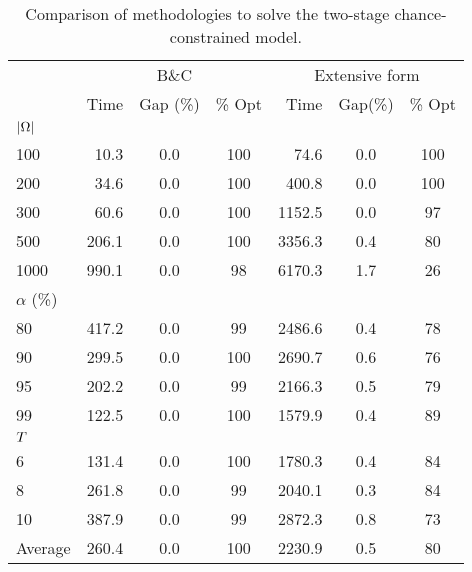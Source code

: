 \documentclass[msom]{oo}
\begin{document}
\begin{table}[ht]
\small
\centering
\caption{Comparison of methodologies to solve the two-stage chance-constrained model.}
\label{tab:MethodologyCompare}
\renewcommand{\arraystretch}{0.8}
\begin{tabular}{lrccrcc}
\toprule
  & \multicolumn{3}{c}{ B\&C} &  \multicolumn{3}{c}{Extensive form}
  \\
\cmidrule(lr){2-4}
\cmidrule(lr){5-7}
& Time       & Gap (\%)       & \% Opt      & Time    & Gap(\%)     & \% Opt   \\
\midrule
$|\Omega|$  &&&&&&\\
100	&	10.3	&	0.0	&	100	&	74.6	&	0.0	&	100	\\
200	&	34.6	&	0.0	&	100	&	400.8	&	0.0	&	100	\\
300	&	60.6	&	0.0	&	100	&		1152.5	&	0.0	&	97	\\
500	&	206.1	&	0.0	&	100	&	3356.3	&	0.4	&	80	\\
1000	&	990.1	&	0.0	&	98	&	6170.3	&	1.7	&	26	\\
\midrule
$\alpha$ (\%) &&&&&&\\
80&	417.2	&	0.0	&	99	&		2486.6	&	0.4	&	78	\\
90&	299.5	&	0.0	&	100	&	2690.7	&	0.6	&	76	\\
95&	202.2	&	0.0	&	99	&	2166.3	&	0.5	&	79	\\
99&	122.5	&	0.0	&	100	&	1579.9	&	0.4	&	89	\\
\midrule
$T$ &&&&&&\\
6	&	131.4	&	0.0	&	100	&		1780.3	&	0.4	&	84	\\
8	&	261.8	&	0.0	&	99	&	2040.1	&	0.3	&	84	\\
10	&	387.9	&	0.0	&	99	&		2872.3	&	0.8	&	73	\\
\midrule
Average &	260.4	&	0.0	&	100	&		2230.9	&	0.5	&	80	\\
\bottomrule
\end{tabular}

\end{table}
\end{document}
